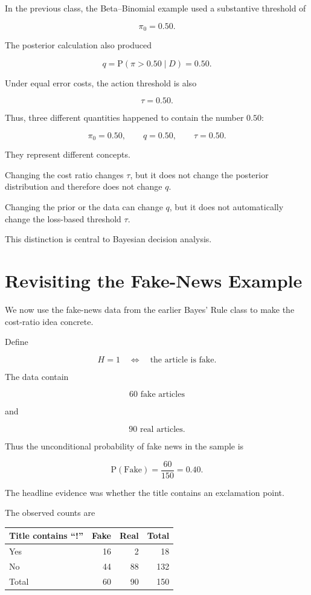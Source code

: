 \documentclass[11pt]{article}
\newcommand{\Prob}{\mathrm{P}}
\begin{document}
In the previous class, the Beta--Binomial example used a substantive threshold of

\[
\pi_0=0.50.
\]

The posterior calculation also produced

\[
q
=
\Prob(\pi>0.50\mid D)
=
0.50.
\]

Under equal error costs, the action threshold is also

\[
\tau=0.50.
\]

Thus, three different quantities happened to contain the number $0.50$:

\[
\boxed{
\pi_0=0.50,
\qquad
q=0.50,
\qquad
\tau=0.50.
}
\]

They represent different concepts.

Changing the cost ratio changes $\tau$, but it does not change the posterior distribution and therefore does not change $q$.

Changing the prior or the data can change $q$, but it does not automatically change the loss-based threshold $\tau$.

This distinction is central to Bayesian decision analysis.

\section{Revisiting the Fake-News Example}

We now use the fake-news data from the earlier Bayes' Rule class to make the cost-ratio idea concrete.

Define

\[
H=1
\quad\Longleftrightarrow\quad
\text{the article is fake}.
\]

The data contain

\[
60\text{ fake articles}
\]

and

\[
90\text{ real articles}.
\]

Thus the unconditional probability of fake news in the sample is

\[
\Prob(\text{Fake})
=
\frac{60}{150}
=
0.40.
\]

The headline evidence was whether the title contains an exclamation point.

The observed counts are

\begin{center}
\begin{tabular}{lrrr}
\toprule
Title contains ``!'' & Fake & Real & Total \\
\midrule
Yes & 16 & 2 & 18 \\
No & 44 & 88 & 132 \\
\midrule
Total & 60 & 90 & 150 \\
\bottomrule
\end{tabular}
\end{center}
\end{document}
